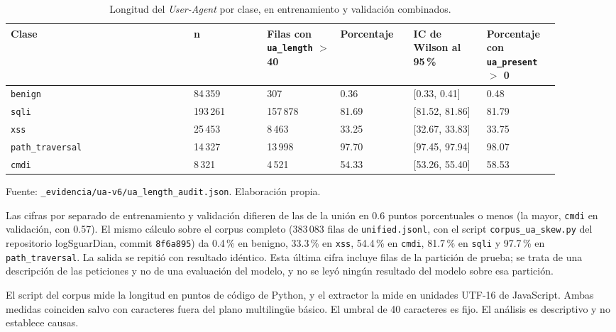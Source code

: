 \begin{table}[htbp]
\centering
\footnotesize
\setlength{\tabcolsep}{3pt}
\begin{tabular}{|p{0.30\linewidth}|p{0.12\linewidth}|p{0.12\linewidth}|p{0.12\linewidth}|p{0.12\linewidth}|p{0.12\linewidth}|}
\hline
\textbf{Clase} & \textbf{n} & \textbf{Filas con \texttt{ua\_length} $>$ 40} & \textbf{Porcentaje} & \textbf{IC de Wilson al 95\,\%} & \textbf{Porcentaje con \texttt{ua\_present} $>$ 0} \\ \hline
\texttt{benign} & 84\,359 & 307 & 0.36 & [0.33, 0.41] & 0.48 \\ \hline
\texttt{sqli} & 193\,261 & 157\,878 & 81.69 & [81.52, 81.86] & 81.79 \\ \hline
\texttt{xss} & 25\,453 & 8\,463 & 33.25 & [32.67, 33.83] & 33.75 \\ \hline
\texttt{path\_traversal} & 14\,327 & 13\,998 & 97.70 & [97.45, 97.94] & 98.07 \\ \hline
\texttt{cmdi} & 8\,321 & 4\,521 & 54.33 & [53.26, 55.40] & 58.53 \\ \hline
\end{tabular}
\caption{Longitud del \textit{User-Agent} por clase, en entrenamiento y validación combinados.}
\label{tabla:anexo-ua}
\par\smallskip\footnotesize Fuente: \texttt{\_evidencia/ua-v6/ua\_length\_audit.json}. Elaboración propia.
\end{table}

Las cifras por separado de entrenamiento y validación difieren de las de la unión en 0.6 puntos porcentuales o menos (la mayor, \texttt{cmdi} en validación, con 0.57). El mismo cálculo sobre el corpus completo (383\,083 filas de \texttt{unified.jsonl}, con el script \texttt{corpus\_ua\_skew.py} del repositorio logSguarDian, commit \texttt{8f6a895}) da 0.4\,\% en benigno, 33.3\,\% en \texttt{xss}, 54.4\,\% en \texttt{cmdi}, 81.7\,\% en \texttt{sqli} y 97.7\,\% en \texttt{path\_traversal}. La salida se repitió con resultado idéntico. Esta última cifra incluye filas de la partición de prueba; se trata de una descripción de las peticiones y no de una evaluación del modelo, y no se leyó ningún resultado del modelo sobre esa partición.

El script del corpus mide la longitud en puntos de código de Python, y el extractor la mide en unidades UTF-16 de JavaScript. Ambas medidas coinciden salvo con caracteres fuera del plano multilingüe básico. El umbral de 40 caracteres es fijo. El análisis es descriptivo y no establece causas.


